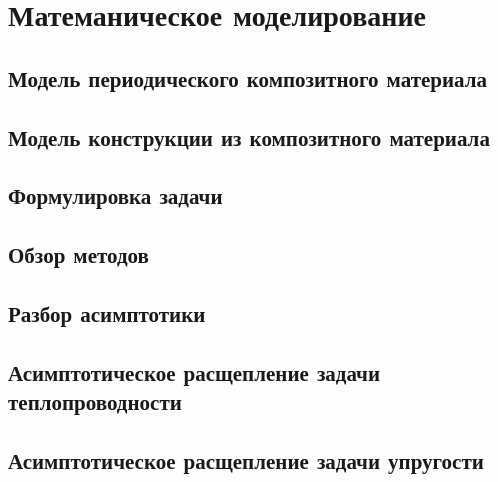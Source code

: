 \chapter{Матеманическое моделирование}\label{ch:ch1}

\section{Модель периодического композитного материала}\label{sec:ch1/sec1}



\section{Модель конструкции из композитного материала}\label{sec:ch1/sec1}



\section{Формулировка задачи}\label{sec:ch1/sec2}

\section{Обзор методов}\label{sec:ch1/sec3}



\section{Разбор асимптотики}\label{sec:ch1/sec4}

\section{Асимптотическое расщепление задачи теплопроводности}\label{sec:ch1/sec5}



\section{Асимптотическое расщепление задачи упругости}\label{sec:ch1/sec6}



\clearpage
